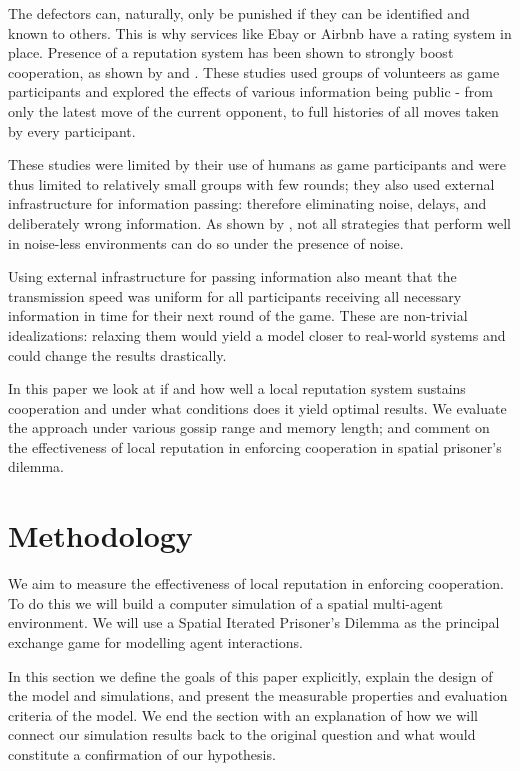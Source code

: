 \documentclass[english]{article}
\begin{document}
The defectors can, naturally, only be punished if they can be identified and known to others. This is why services like Ebay or Airbnb have a rating system in place.
Presence of a reputation system has been shown to strongly boost cooperation, as shown by \citet{simple-reputation} and \citet{public-private-monitoring}.
These studies used groups of volunteers as game participants and explored the effects of various information being public - from only the latest move of the current opponent, to full histories of all moves taken by every participant.

These studies were limited by their use of humans as game participants and were thus limited to relatively small groups with few rounds; they also used external infrastructure for information passing: therefore eliminating noise, delays, and deliberately wrong information.
As shown by \citet{noise}, not all strategies that perform well in noise-less environments can do so under the presence of noise.

Using external infrastructure for passing information also meant that the transmission speed was uniform for all participants receiving all necessary information in time for their next round of the game.
These are non-trivial idealizations: relaxing them would yield a model closer to real-world systems and could change the results drastically.

In this paper we look at if and how well a local reputation system sustains cooperation and under what conditions does it yield optimal results.
We evaluate the approach under various gossip range and memory length; and comment on the effectiveness of local reputation in enforcing cooperation in spatial prisoner's dilemma.



\section{Methodology}
We aim to measure the effectiveness of local reputation in enforcing cooperation.
To do this we will build a computer simulation of a spatial multi-agent environment.
We will use a Spatial Iterated Prisoner's Dilemma as the principal exchange game for modelling agent interactions.

In this section we define the goals of this paper explicitly,
explain the design of the model and simulations,
and present the measurable properties and evaluation criteria of the model.
We end the section with an explanation of how we will connect our simulation results back to the original question
and what would constitute a confirmation of our hypothesis.
\end{document}
